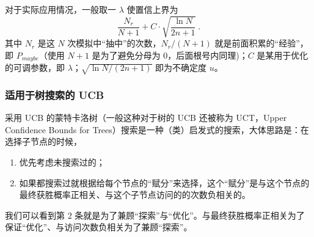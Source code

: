 对于实际应用情况，一般取一 $\lambda$ 使置信上界为
$$\frac{N_r}{N+1} + C \cdot \sqrt{\frac{\ln N}{2n+1}} ~.$$
其中 $N_r$ 是这 $N$ 次模拟中“抽中”的次数，$N_r/(N+1)$ 就是前面积累的“经验”，即 $P_{maybe}$（使用 $N+1$ 是为了避免分母为 $0$，后面根号内同理)；$C$ 是某用于优化的可调参数，即 $\lambda$；$\sqrt{\ln N/(2n+1)}$ 即为不确定度 $u$。

\subsubsection{适用于树搜索的 UCB}
采用 UCB 的蒙特卡洛树（一般这种对于树的 UCB 还被称为 UCT，Upper Confidence Bounds for Trees）搜索是一种（类）启发式的搜索，大体思路是：在选择子节点的时候，
\begin{enumerate}
\item 优先考虑未搜索过的；
\item 如果都搜索过就根据给每个节点的“赋分”来选择，这个“赋分”是与这个节点的最终获胜概率正相关、与这个子节点访问的的次数负相关的。
\end{enumerate}
我们可以看到第 $2$ 条就是为了兼顾“探索”与“优化”。与最终获胜概率正相关为了保证“优化”、与访问次数负相关为了兼顾“探索”。
